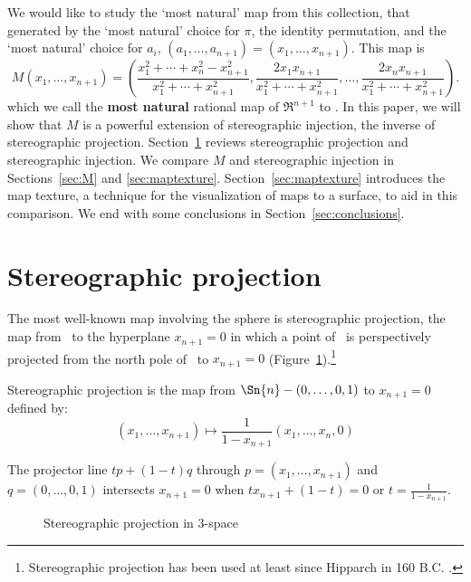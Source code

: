 We would like to study the `most natural' map from this collection,
that generated by the `most natural' choice for $\pi$,
the identity permutation, and the `most natural' choice for $a_i$,
$(a_1,\ldots,a_{n+1}) = (x_1,\ldots,x_{n+1})$.
This map is 
\begin{equation}
\label{eq:Mmap}
	M(x_1,\ldots,x_{n+1}) = 
	(\frac{x_1^2 + \cdots + x_{n}^2 - x_{n+1}^2}{x_1^2 + \cdots + x_{n+1}^2},
	 \frac{2x_1x_{n+1}}{x_1^2 + \cdots + x_{n+1}^2},\ldots,
	 \frac{2x_{n}x_{n+1}}{x_1^2 + \cdots + x_{n+1}^2}).
\end{equation}
which we call the {\bf most natural} rational map of $\Re^{n+1}$ to .
In this paper, we will show that $M$ is a powerful extension
of stereographic injection, the inverse of stereographic projection.
Section~\ref{sec:stereo} reviews stereographic projection and stereographic
injection.
We compare $M$ and stereographic injection 
in Sections~\ref{sec:M} and \ref{sec:maptexture}.
Section~\ref{sec:maptexture} introduces the map texture, 
a technique for the visualization of maps to a surface, 
to aid in this comparison.
We end with some conclusions in Section~\ref{sec:conclusions}.

\section{Stereographic projection}
\label{sec:stereo}

The most well-known map involving the sphere is stereographic projection, 
the map from \ to the hyperplane $x_{n+1}=0$ 
in which a point of \ is perspectively projected from 
the north pole of \ to $x_{n+1}=0$  %
(Figure~\ref{fig:stereo}).\footnote{Stereographic projection has been
	used at least since Hipparch in 160 B.C. \cite{kreyszig59}.}

\begin{lemma}
Stereographic projection is the map from 
$\Sn{n} - (0,\ldots,0,1)$ to $x_{n+1}=0$ defined by:
\[ (x_1,\ldots,x_{n+1}) \mapsto \frac{1}{1-x_{n+1}} (x_1,\ldots,x_n,0) \]
\end{lemma}
\prf
The projector line $tp + (1-t)q$ through $p = (x_1,\ldots,x_{n+1})$ 
and $q = (0,\ldots,0,1)$ intersects $x_{n+1}=0$ 
when $tx_{n+1} + (1-t) = 0$ or $t = \frac{1}{1-x_{n+1}}$.
\QED

\begin{figure}[ht]
\vspace{3in}
\caption{Stereographic projection in 3-space}
\label{fig:stereo}
\end{figure}

